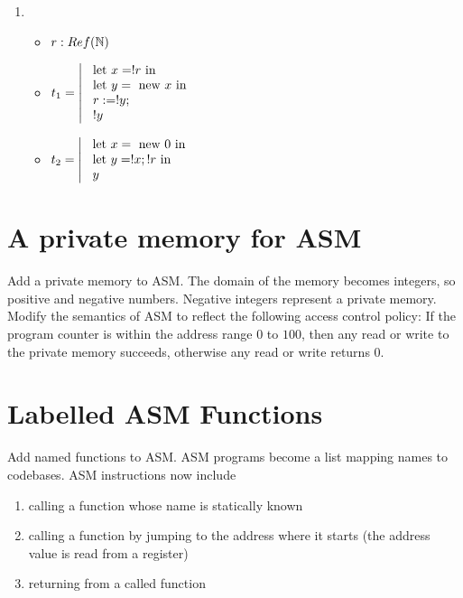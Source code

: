 \documentclass{article}
\begin{document}
\begin{enumerate}
    \item 
        \begin{itemize}
            \item $r:Ref(\mathbb N)$
            \item $t_1=\left|\begin{array}{l}\LET x=!r \TIN\\ \LET y=\NEW x \TIN\\\ r:=!y;\\\ !y\end{array}\right.$
            \item $t_2=\left|\begin{array}{l}\text{ let } x=\text{ new } 0 \text{ in } \\ \text{ let } y=!x;!r \text{ in }\\\ y\end{array}\right.$
        \end{itemize}
\end{enumerate}

\section{A private memory for ASM}
Add a private memory to ASM. The domain of the memory becomes integers, so positive and negative numbers. Negative integers represent a private memory. \\
Modify the semantics of ASM to reflect the following access control policy:
If the program counter is within the address range $0$ to $100$, then any read or write to the private memory succeeds, otherwise any read or write returns $0$.

\section{Labelled ASM Functions}
Add named functions to ASM. ASM programs become a list mapping names to codebases. ASM instructions now include
\begin{enumerate}
    \item calling a function whose name is statically known
    \item calling a function by jumping to the address where it starts (the address value is read from a register)
    \item returning from a called function
\end{enumerate}
\end{document}
